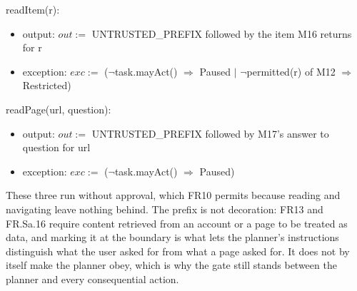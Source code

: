 \documentclass[12pt, titlepage]{article}
\begin{document}
\noindent readItem(r):
\begin{itemize}
\item output: $out :=$ UNTRUSTED\_PREFIX followed by the item M16 returns for r
\item exception: $exc :=$ ($\lnot$task.mayAct() $\Rightarrow$ Paused $|$
$\lnot$permitted(r) of M12 $\Rightarrow$ Restricted)
\end{itemize}

\noindent readPage(url, question):
\begin{itemize}
\item output: $out :=$ UNTRUSTED\_PREFIX followed by M17's answer to question
for url
\item exception: $exc :=$ ($\lnot$task.mayAct() $\Rightarrow$ Paused)
\end{itemize}

\noindent These three run without approval, which FR10 permits because reading
and navigating leave nothing behind. The prefix is not decoration: FR13 and
FR.Sa.16 require content retrieved from an account or a page to be treated as
data, and marking it at the boundary is what lets the planner's instructions
distinguish what the user asked for from what a page asked for. It does not by
itself make the planner obey, which is why the gate still stands between the
planner and every consequential action.
\end{document}
